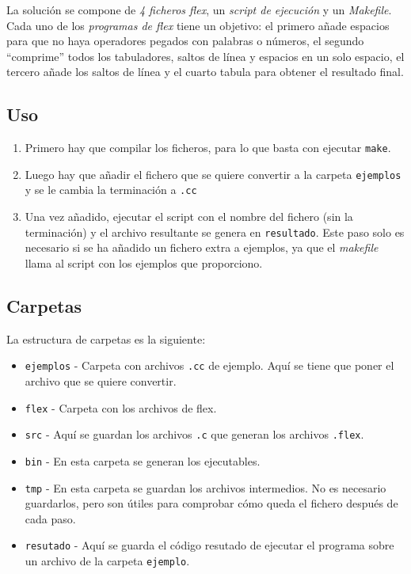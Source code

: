 \documentclass[10pt]{article}
\begin{document}
    La solución se compone de \emph{4 ficheros flex}, un \emph{script de ejecución} y un \emph{Makefile}. Cada uno de los \emph{programas de flex} tiene un objetivo: el primero añade espacios para que no haya operadores pegados con palabras o números, el segundo ``comprime'' todos los tabuladores, saltos de línea y espacios en un solo espacio, el tercero añade los saltos de línea y el cuarto tabula para obtener el resultado final.

    \subsection{Uso}

    \begin{enumerate}
        \item Primero hay que compilar los ficheros, para lo que basta con ejecutar \texttt{make}.
        \item Luego hay que añadir el fichero que se quiere convertir a la carpeta \texttt{ejemplos} y se le cambia la terminación a \texttt{.cc}
        \item Una vez añadido, ejecutar el script con el nombre del fichero (sin la terminación) y el archivo resultante se genera en \texttt{resultado}. Este paso solo es necesario si se ha añadido un fichero extra a ejemplos, ya que el \emph{makefile} llama al script con los ejemplos que proporciono.
    \end{enumerate}

    \subsection{Carpetas}
    
    La estructura de carpetas es la siguiente:

    \begin{itemize}
        \item \texttt{ejemplos} - Carpeta con archivos \texttt{.cc} de ejemplo. Aquí se tiene que poner el archivo que se quiere convertir.
        \item \texttt{flex} - Carpeta con los archivos de flex.
        \item \texttt{src} - Aquí se guardan los archivos \texttt{.c} que generan los archivos \texttt{.flex}.
        \item \texttt{bin} - En esta carpeta se generan los ejecutables.
        \item \texttt{tmp} - En esta carpeta se guardan los archivos intermedios. No es necesario guardarlos, pero son útiles para comprobar cómo queda el fichero después de cada paso.
        \item \texttt{resutado} - Aquí se guarda el código resutado de ejecutar el programa sobre un archivo de la carpeta \texttt{ejemplo}.
    \end{itemize}
\end{document}
